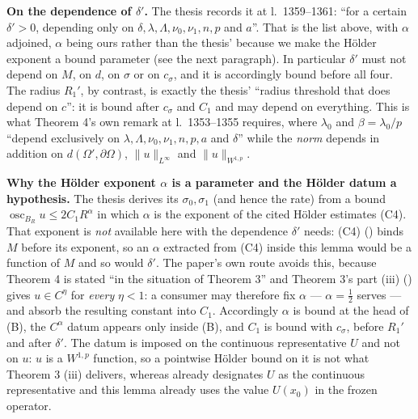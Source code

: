 \begin{lemma}
\medskip
\noindent\textbf{On the dependence of $\delta'$.}  The thesis records it at
l.~1359--1361: ``for a certain $\delta'>0$, depending only on
$\delta,\lambda,\Lambda,\nu_0,\nu_1,n,p$ and $a$''.  That is the list above,
with $\alpha$ adjoined, $\alpha$ being ours rather than the thesis'
because we make the H\"older exponent a bound parameter (see the next
paragraph).  In particular $\delta'$ must not depend on $M$, on $d$, on $\sigma$
or on $c_\sigma$, and it is accordingly bound before all four.  The radius
$R_1'$, by contrast, is exactly the thesis' ``radius threshold that does depend
on $c$'': it is bound after $c_\sigma$ and $C_1$ and may depend on everything.
This is what Theorem 4's own remark at l.~1353--1355 requires, where $\lambda_0$
and $\beta=\lambda_0/p$ ``depend exclusively on
$\lambda,\Lambda,\nu_0,\nu_1,n,p,a$ and $\delta$'' while the \emph{norm} depends
in addition on $d(\Omega',\partial\Omega)$, $\|u\|_{L^\infty}$ and
$\|u\|_{W^{1,p}}$.

\medskip
\noindent\textbf{Why the H\"older exponent $\alpha$ is a parameter and the
H\"older datum a hypothesis.}  The thesis derives its $\sigma_0,\sigma_1$ (and
hence the rate) from a bound $\operatorname*{osc}_{B_R}u\le2C_1R^{\alpha}$ in
which $\alpha$ is the exponent of the cited H\"older estimates (C4).  That
exponent is \emph{not} available here with the dependence $\delta'$ needs:
(C4) () binds $M$ before its exponent, so an
$\alpha$ extracted from (C4) inside this lemma would be a function of $M$ and
so would $\delta'$.  The paper's own route avoids this, because Theorem 4 is
stated ``in the situation of Theorem 3'' and Theorem 3's part (iii)
() gives $u\in C^\eta$ for \emph{every}
$\eta<1$: a consumer may therefore fix $\alpha$ --- $\alpha=\tfrac12$ serves ---
and absorb the resulting constant into $C_1$.  Accordingly $\alpha$ is bound at
the head of (B), the $C^\alpha$ datum appears only inside (B), and $C_1$ is
bound with $c_\sigma$, before $R_1'$ and after $\delta'$.  The datum is imposed
on the continuous representative $U$ and not on $u$: $u$ is a $W^{1,p}$
function, so a pointwise H\"older bound on it is not what Theorem 3 (iii)
delivers, whereas  already designates $U$ as the
continuous representative and this lemma already uses the value $U(x_0)$ in the
frozen operator.


\end{lemma}
